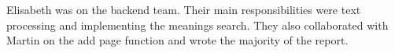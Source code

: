 Elisabeth was on the backend team. Their main responsibilities were text processing and implementing the meanings search. They also collaborated with Martin on the add page function and wrote the majority of the report. \\

